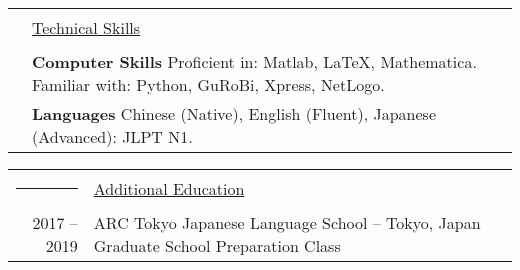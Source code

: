 \documentclass[a4paper,10pt]{article}
\newcommand{\headingfont}{\LARGE \MakeUppercase }
\newenvironment{SectionTable}[1]{
	\renewcommand*{\arraystretch}{1.0}
	\setlength{\tabcolsep}{10pt}
	\begin{longtable}{Rp{5.2in}} 
		\rule{2.3cm}{4pt} 
		& \underline{#1} \\ %
	}
	{
	\end{longtable}\vspace{-.3cm}
}
\begin{document}
\begin{SectionTable}{\headingfont Technical Skills}
& \textbf{Computer Skills} \newline
Proficient in: Matlab, \LaTeX, Mathematica. \newline
Familiar with: Python, GuRoBi, Xpress, NetLogo. \\

& \textbf{Languages} \newline
Chinese (Native), English (Fluent), Japanese (Advanced): JLPT N1.
\end{SectionTable}

%


\begin{SectionTable}{\headingfont Additional Education}
	2017 -- 2019 & ARC Tokyo Japanese Language School -- Tokyo, Japan \newline
	Graduate School Preparation Class \\
\end{SectionTable}


\end{document}
